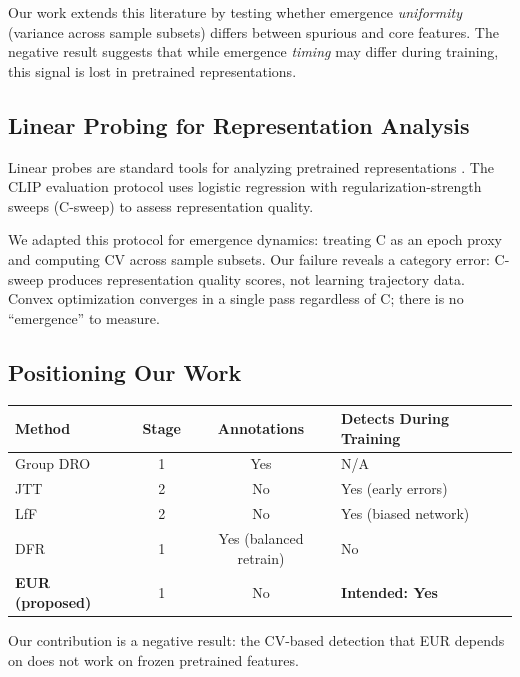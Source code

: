 Our work extends this literature by testing whether emergence \emph{uniformity} (variance across sample subsets) differs between spurious and core features. The negative result suggests that while emergence \emph{timing} may differ during training, this signal is lost in pretrained representations.

\subsection{Linear Probing for Representation Analysis}

Linear probes are standard tools for analyzing pretrained representations \citep{alain2017understanding}. The CLIP evaluation protocol \citep{radford2021learning} uses logistic regression with regularization-strength sweeps (C-sweep) to assess representation quality.

We adapted this protocol for emergence dynamics: treating C as an epoch proxy and computing CV across sample subsets. Our failure reveals a category error: C-sweep produces representation quality scores, not learning trajectory data. Convex optimization converges in a single pass regardless of C; there is no ``emergence'' to measure.

\subsection{Positioning Our Work}

\begin{table}[h]
\centering
\begin{tabular}{@{}lccl@{}}
\toprule
Method & Stage & Annotations & Detects During Training \\
\midrule
Group DRO & 1 & Yes & N/A \\
JTT & 2 & No & Yes (early errors) \\
LfF & 2 & No & Yes (biased network) \\
DFR & 1 & Yes (balanced retrain) & No \\
\textbf{EUR (proposed)} & 1 & No & \textbf{Intended: Yes} \\
\bottomrule
\end{tabular}
\end{table}

Our contribution is a negative result: the CV-based detection that EUR depends on does not work on frozen pretrained features.

